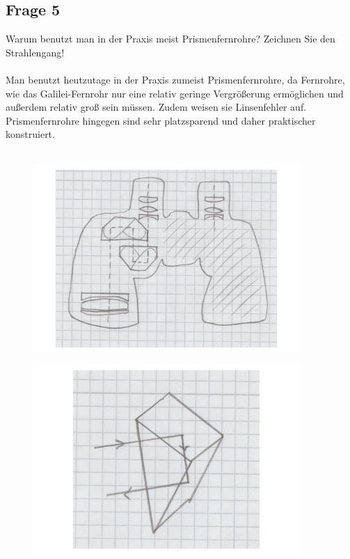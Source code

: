 \documentclass[a4paper,10pt]{scrartcl}
\begin{document}
		\subsection{Frage 5}
			Warum benutzt man in der Praxis meist Prismenfernrohre? Zeichnen Sie den Strahlengang!\\
			\\
			Man benutzt heutzutage in der Praxis zumeist Prismenfernrohre, da Fernrohre, wie das Galilei-Fernrohr nur eine relativ geringe Vergrößerung ermöglichen und außerdem relativ groß sein müssen. Zudem weisen sie Linsenfehler auf. Prismenfernrohre hingegen sind sehr platzsparend und daher praktischer konstruiert.\\
			\\
	\begin{figure}[h]
\centering
\includegraphics[width=0.9\textwidth]{./Bilder/og1}
\end{figure}
	\begin{figure}[h]
\centering
\includegraphics[width=0.9\textwidth]{./Bilder/og2}
\end{figure}
\FloatBarrier
\FloatBarrier			\\
			
\end{document}

